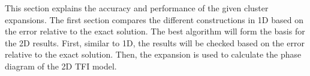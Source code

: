 This section explains the accuracy and performance of the given cluster expansions. The first section compares the different constructions in 1D based on the error relative to the exact solution. The best algorithm will form the basis for the 2D results. First, similar to 1D, the results will be checked based on the error relative to the exact solution. Then, the expansion is used to calculate the phase diagram of the 2D \Gls{TFI} model.